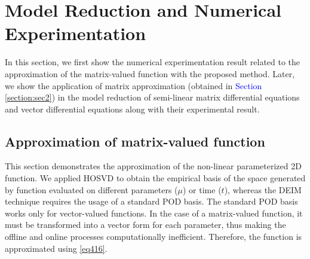 \documentclass{article}
\begin{document}
\section{Model Reduction and Numerical Experimentation}
\label{section:sec3}
In this section, we first show the numerical experimentation result related to the approximation of the matrix-valued function with the proposed method. Later, we show the application of matrix approximation (obtained in \textcolor{blue}{Section \ref{section:sec2}}) in the model reduction of semi-linear matrix differential equations and vector differential equations along with their experimental result.

\subsection{Approximation of matrix-valued function}\label{AMVF}
This section demonstrates the approximation of the non-linear parameterized 2D function. We applied HOSVD to obtain the empirical basis of the space generated by function evaluated on different parameters ($\mu$) or time ($t$), whereas the DEIM technique \cite{DEIM} requires the usage of a standard POD basis. The standard POD basis works only for vector-valued functions. In the case of a matrix-valued function, it must be transformed into a vector form for each parameter, thus making the offline and online processes computationally inefficient. Therefore, the function is approximated using \eqref{eq416}.
\end{document}

